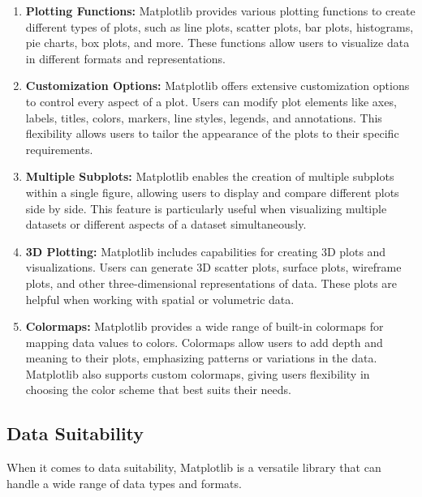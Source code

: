 \begin{enumerate}
	\item \textbf{Plotting Functions:} Matplotlib provides various plotting functions to create different types of plots, such as line plots, scatter plots, bar plots, histograms, pie charts, box plots, and more. These functions allow users to visualize data in different formats and representations.
	
	\item \textbf{Customization Options:} Matplotlib offers extensive customization options to control every aspect of a plot. Users can modify plot elements like axes, labels, titles, colors, markers, line styles, legends, and annotations. This flexibility allows users to tailor the appearance of the plots to their specific requirements.
	
	\item \textbf{Multiple Subplots:} Matplotlib enables the creation of multiple subplots within a single figure, allowing users to display and compare different plots side by side. This feature is particularly useful when visualizing multiple datasets or different aspects of a dataset simultaneously.
	
	\item \textbf{3D Plotting:} Matplotlib includes capabilities for creating 3D plots and visualizations. Users can generate 3D scatter plots, surface plots, wireframe plots, and other three-dimensional representations of data. These plots are helpful when working with spatial or volumetric data.
	
	\item \textbf{Colormaps:} Matplotlib provides a wide range of built-in colormaps for mapping data values to colors. Colormaps allow users to add depth and meaning to their plots, emphasizing patterns or variations in the data. Matplotlib also supports custom colormaps, giving users flexibility in choosing the color scheme that best suits their needs.
\end{enumerate} 


\subsection{Data Suitability}

When it comes to data suitability, Matplotlib is a versatile library that can handle a wide range of data types and formats.

